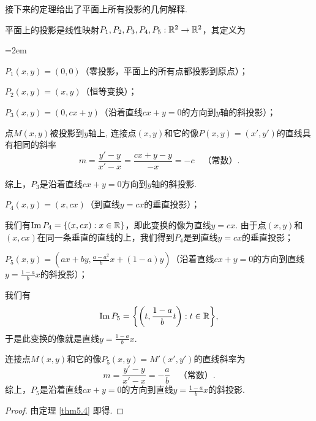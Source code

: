 接下来的定理给出了平面上所有投影的几何解释.

\begin{mybox}
  \begin{theorem}[平面投影.]

    平面上的投影是线性映射$P_1,P_2,P_3,P_4,P_5:\mathbb R^2\to\mathbb R^2$，其定义为
    \begin{enum}\parindent=2em
      \item $P_1(x,y)=(0,0)$（零投影，平面上的所有点都投影到原点）；
      \item $P_2(x,y)=(x,y)$（恒等变换）；
      \item $P_3(x,y)=(0,cx+y)$（沿着直线$cx+y=0$的方向到$y$轴的斜投影）；

          点$M(x,y)$被投影到$y$轴上, 连接点$(x,y)$和它的像$P(x,y)=(x',y')$的直线具有相同的斜率
          \[
            m = \frac{y'-y}{x'-x} = \frac{cx+y-y}{-x} = -c\quad \text{（常数）}.
          \]

          综上，$P_3$是沿着直线$cx+y=0$方向到$y$轴的斜投影.
      \item $P_4(x,y)=(x,cx)$（到直线$y=cx$的垂直投影）；

          我们有$\operatorname{Im} P_4=\{(x,cx):x\in\mathbb R\}$，即此变换的像为直线$y=cx$. 由于点$(x,y)$和$(x,cx)$在同一条垂直的直线的上，我们得到$P_4$是到直线$y=cx$的垂直投影；

      \item $P_5(x,y)=\left(ax+by,\frac{a-a^2}bx+(1-a)y
          \right)$（沿着直线$cx+y=0$的方向到直线$y=\frac{1-a}bx$的斜投影）；

          我们有
          \[
            \im P_5 = \left\{ \left( t,\frac{1-a}bt\right):t\in\MR \right\},
          \]
          于是此变换的像就是直线$y=\frac{1-a}bx$.

          连接点$M(x,y)$和它的像$P_5(x,y)=M'(x',y')$的直线斜率为
          \[
            m = \frac{y'-y}{x'-x} = - \frac ab \quad \text{（常数）}.
          \]
          综上，$P_5$是沿着直线$cx+y=0$的方向到直线$y=\frac{1-a}bx$的斜投影.
    \end{enum}
  \end{theorem}
\end{mybox}
\begin{proof}
  由定理 \ref{thm5.4} 即得.
\end{proof}

